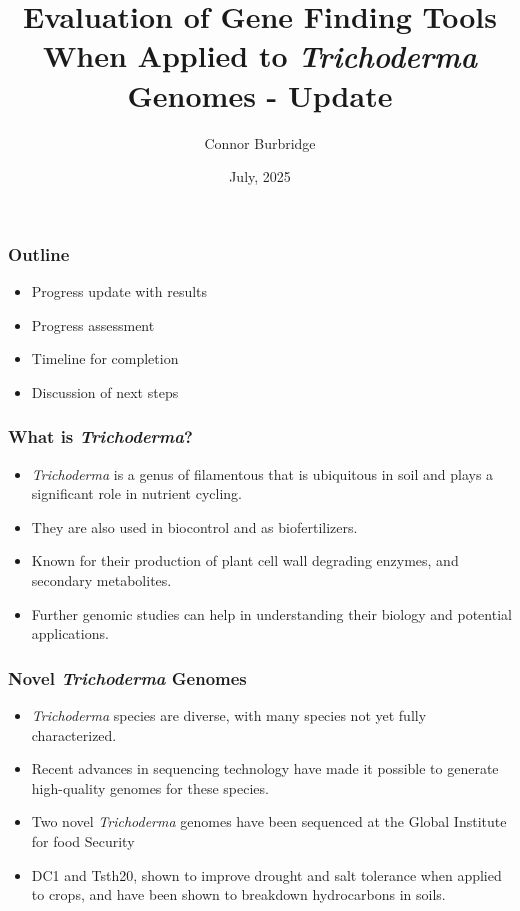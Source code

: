 \documentclass[t]{beamer}
\title{Evaluation of Gene Finding Tools When Applied to \textit{Trichoderma} Genomes - Update}
\date{July, 2025}
\author{Connor Burbridge}
\institute{Department of Computer Science}
\begin{document}
\begin{frame}
	\titlepage
\end{frame}

\begin{frame}
	\frametitle{Outline} 

	\begin{itemize}
		\item Progress update with results
		\item Progress assessment
		\item Timeline for completion	
		\item Discussion of next steps
	\end{itemize}
\end{frame}



\begin{frame}
	\frametitle{What is \textit{Trichoderma}?}
	\begin{itemize}
		\item \textit{Trichoderma} is a genus of filamentous that is ubiquitous in soil and plays a significant role in nutrient cycling.
		\item They are also used in biocontrol and as biofertilizers.
		\item Known for their production of plant cell wall degrading enzymes, and secondary metabolites.
		\item Further genomic studies can help in understanding their biology and potential applications.
	\end{itemize}
\end{frame}

\begin{frame}
	\frametitle{Novel \textit{Trichoderma} Genomes}
	\begin{itemize}
		\item \textit{Trichoderma} species are diverse, with many species not yet fully characterized.
		\item Recent advances in sequencing technology have made it possible to generate high-quality genomes for these species.
		\item Two novel \textit{Trichoderma} genomes have been sequenced at the Global Institute for food Security
		\item DC1 and Tsth20, shown to improve drought and salt tolerance when applied to crops, and have been shown to breakdown hydrocarbons in soils.
	\end{itemize}
\end{frame}
\end{document}
